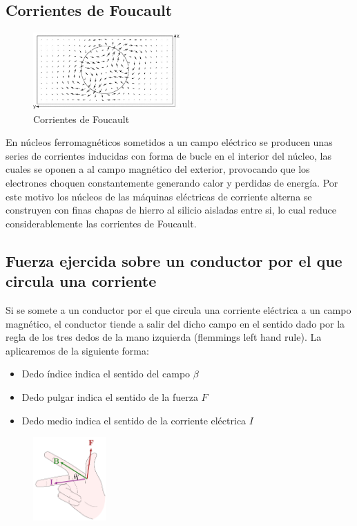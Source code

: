 \documentclass{report}
\begin{document}
\vspace{1em}
  \subsection{Corrientes de Foucault}\label{ssec:corrientes_de_foucault}
\begin{figure}
  \vspace{-1.5em}
  \centering
  \includegraphics[width=0.5\textwidth]{figures/parasite_currents.png}
  \caption{Corrientes de Foucault}
  \label{fig:parasite_currents}
\end{figure}
En núcleos ferromagnéticos sometidos a un campo eléctrico se producen unas series de corrientes inducidas 
con forma de bucle en el interior del núcleo, las cuales se oponen a al campo magnético del exterior, 
provocando que los electrones choquen constantemente generando calor y perdidas de energía.
\fspace{1em}
Por este motivo los núcleos de las máquinas eléctricas de corriente alterna se construyen con finas
chapas de hierro al silicio aisladas entre si, lo cual reduce considerablemente las corrientes de Foucault.

\newpage
  \subsection{Fuerza ejercida sobre un conductor por el que circula una corriente}\label{ssec:fuerza_ejercida}
Si se somete a un conductor por el que circula una corriente eléctrica a un campo magnético, el conductor tiende a salir del dicho campo
en el sentido dado por la regla de los tres dedos de la mano izquierda (flemmings left hand rule). La aplicaremos de la siguiente forma:
\begin{itemize}
  \item Dedo índice indica el sentido del campo $\beta$ 
  \item Dedo pulgar indica el sentido de la fuerza $F$
  \item Dedo medio indica el sentido de la corriente eléctrica $I$  
\end{itemize}
\begin{figure}[h]
  \centering
  \includegraphics[width=0.25\textwidth]{left-hand/right-hand.pdf}
\end{figure}
\vspace{1.5em}
\end{document}
